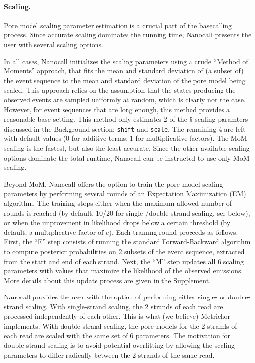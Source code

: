 \documentclass{bioinfo}
\begin{document}
\begin{methods}
\paragraph{Scaling.}
Pore model scaling parameter estimation is a crucial part of the basecalling process. Since accurate scaling dominates the running time, Nanocall presents the user with several scaling options.

In all cases, Nanocall initializes the scaling parameters using a crude ``Method of Moments'' approach, that fits the mean and standard deviation of (a subset of) the event sequence to the mean and standard deviation of the pore model being scaled. This approach relies on the assumption that the states producing the observed events are sampled uniformly at random, which is clearly not the case. However, for event sequences that are long enough, this method provides a reasonable base setting. This method only estimates 2 of the 6 scaling paramters discussed in the Background section: \texttt{shift} and \texttt{scale}. The remaining 4 are left with default values (0 for additive terms, 1 for multiplicative factors). The MoM scaling is the fastest, but also the least accurate. Since the other available scaling options dominate the total runtime, Nanocall can be instructed to use only MoM scaling.

Beyond MoM, Nanocall offers the option to train the pore model scaling parameters by performing several rounds of an Expectation Maximization (EM) algorithm. The training stops either when the maximum allowed number of rounds is reached (by default, 10/20 for single-/double-strand scaling, see below), or when the improvement in likelihood drops below a certain threshold (by default, a multiplicative factor of $e$). Each training round proceeds as follows. First, the ``E'' step consists of running the standard Forward-Backward algorithm to compute posterior probabilities on 2 subsets of the event sequence, extracted from the start and end of each strand. Next, the ``M'' step updates all 6 scaling parameters with values that maximize the likelihood of the observed emissions. More details about this update process are given in the Supplement.

Nanocall provides the user with the option of performing either single- or double- strand scaling. With single-strand scaling, the 2 strands of each read are processed independently of each other. This is what (we believe) Metrichor implements. With double-strand scaling, the pore models for the 2 strands of each read are scaled with the same set of 6 parameters. The motivation for double-strand scaling is to avoid potential overfitting by allowing the scaling parameters to differ radically between the 2 strands of the same read.


\end{methods}
\end{document}
